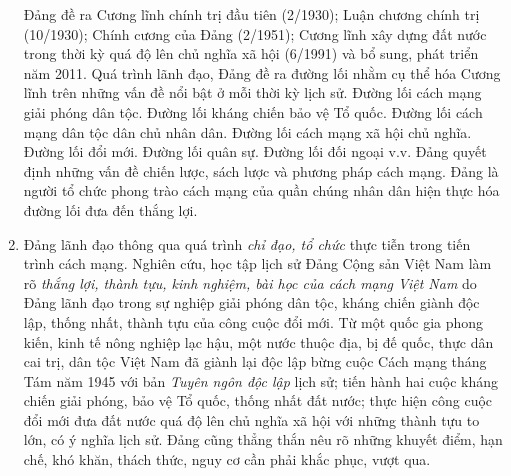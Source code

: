 \begin{enumerate}
Đảng đề ra Cương lĩnh chính trị đầu tiên (2/1930); Luận chương chính trị (10/1930); Chính cương của Đảng (2/1951); Cương lĩnh xây dựng đất nước trong thời kỳ quá độ lên chủ nghĩa xã hội (6/1991) và bổ sung, phát triển năm 2011. Quá trình lãnh đạo, Đảng đề ra đường lối nhằm cụ thể hóa Cương lĩnh trên những vấn đề nổi bật ở mỗi thời kỳ lịch sử. Đường lối cách mạng giải phóng dân tộc. Đường lối kháng chiến bảo vệ Tổ quốc. Đường lối cách mạng dân tộc dân chủ nhân dân. Đường lối cách mạng xã hội chủ nghĩa. Đường lối đổi mới. Đường lối quân sự. Đường lối đối ngoại v.v. Đảng quyết định những vấn đề chiến lược, sách lược và phương pháp cách mạng. Đảng là người tổ chức phong trào cách mạng của quần chúng nhân dân hiện thực hóa đường lối đưa đến thắng lợi.

\item Đảng lãnh đạo thông qua quá trình \textit{chỉ đạo, tổ chức} thực tiễn trong tiến trình cách mạng. Nghiên cứu, học tập lịch sử Đảng Cộng sản Việt Nam làm rõ \textit{thắng lợi, thành tựu, kinh nghiệm, bài học của cách mạng Việt Nam} do Đảng lãnh đạo trong sự nghiệp giải phóng dân tộc, kháng chiến giành độc lập, thống nhất, thành tựu của công cuộc đổi mới. Từ một quốc gia phong kiến, kinh tế nông nghiệp lạc hậu, một nước thuộc địa, bị đế quốc, thực dân cai trị, dân tộc Việt Nam đã giành lại độc lập bừng cuộc Cách mạng tháng Tám năm 1945 với bản \textit{Tuyên ngôn độc lập} lịch sử; tiến hành hai cuộc kháng chiến giải phóng, bảo vệ Tổ quốc, thống nhất đất nước; thực hiện công cuộc đổi mới đưa đất nước quá độ lên chủ nghĩa xã hội với những thành tựu to lớn, có ý nghĩa lịch sử. Đảng cũng thẳng thắn nêu rõ những khuyết điểm, hạn chế, khó khăn, thách thức, nguy cơ cần phải khắc phục, vượt qua.


\end{enumerate}
